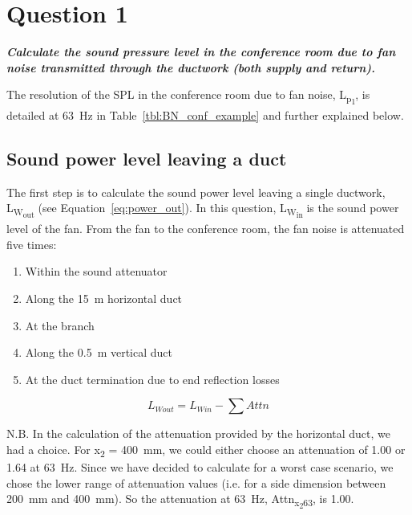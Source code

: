 \section{Question 1} \label{sec:Q1}

\textbf{\textit{Calculate the sound pressure level in the conference room due to fan noise transmitted through the ductwork (both supply and return).}}


The resolution of the SPL in the conference room due to fan noise, L\textsubscript{p\textsubscript{1}}, is detailed at 63~Hz in Table~\ref{tbl:BN_conf_example} and further explained below.


\subsection{Sound power level leaving a duct}

The first step is to calculate the sound power level leaving a single ductwork, L\textsubscript{W\textsubscript{out}} (see Equation~\ref{eq:power_out}).
In this question, L\textsubscript{W\textsubscript{in}} is the sound power level of the fan.
From the fan to the conference room, the fan noise is attenuated five times:
\begin{enumerate}
	\item Within the sound attenuator
	\item Along the 15~m horizontal duct
	\item At the branch
	\item Along the 0.5~m vertical duct
	\item At the duct termination due to end reflection losses
\end{enumerate}

    \begin{equation}\label{eq:power_out}
		L_{W out} = L_{W in} - \sum Attn
	\end{equation}

N.B. In the calculation of the attenuation provided by the horizontal duct, we had a choice.
For x\textsubscript{2} = 400~mm, we could either choose an attenuation of 1.00 or 1.64 at 63~Hz.
Since we have decided to calculate for a worst case scenario, we chose the lower range of attenuation values (i.e. for a side dimension between 200~mm and 400~mm).
So the attenuation at 63~Hz, Attn\textsubscript{x\textsubscript{2}63}, is 1.00.


